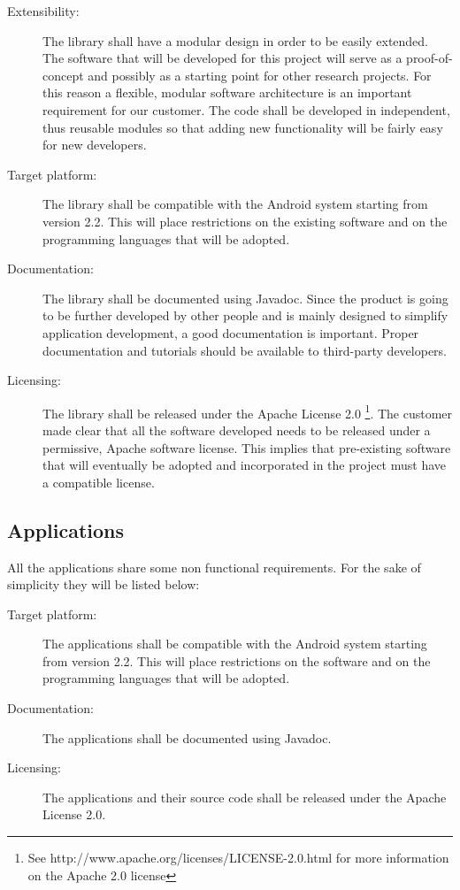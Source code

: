\begin{description}
	\item[Extensibility:] The library shall have a modular design
	in order to be easily extended. The software that will be developed for
	this project will serve as a proof-of-concept and possibly as a starting
	point for other research projects. For this reason a flexible, modular
	software architecture is an important requirement for our customer. The code
	shall be developed in independent, thus reusable modules so that adding new
	functionality will be fairly easy for new developers.
	\item[Target platform:] The library shall be compatible with the Android
	system starting from version 2.2. This will place restrictions on the
	existing software and on the programming languages that will be adopted.
	\item[Documentation:] The library shall be documented using Javadoc.
	Since the product is going to be further developed by other people and is
	mainly designed to simplify application development, a good documentation is
	important. Proper documentation and tutorials should be available to
	third-party developers.
	\item[Licensing:] The library shall be released under the Apache License 2.0
	\footnote{See http://www.apache.org/licenses/LICENSE-2.0.html for more
	information on the Apache 2.0 license}. The customer made clear that all the
	software developed needs to be released under a permissive, Apache software
	license. This implies that pre-existing software that will eventually be
	adopted and incorporated in the project must have a compatible license.
\end{description}

\subsection{Applications}

All the applications share some non functional requirements.
For the sake of simplicity they will be listed below:

\begin{description}
	\item[Target platform:] The applications shall be compatible with the
	Android system starting from version 2.2. This will place restrictions on
	the software and on the programming languages that will be adopted.
	\item[Documentation:] The applications shall be documented using Javadoc.
	\item[Licensing:] The applications and their source code shall be released under the Apache
	License 2.0.
\end{description}
